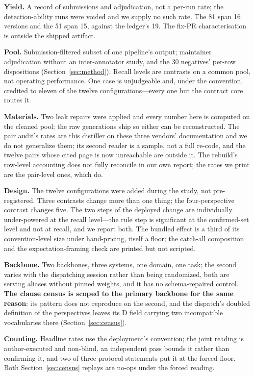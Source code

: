 \documentclass[acmsmall,screen,review,anonymous]{acmart}
\begin{document}
\textbf{Yield.} A record of submissions and adjudication, not a per-run rate; the detection-ability
runs were voided and we supply no such rate. The 81 span 16 versions and the 51 span 15, against the
ledger's 19. The fix-PR characterisation is outside the shipped artifact.

\textbf{Pool.} Submission-filtered subset of one pipeline's output; maintainer adjudication without
an inter-annotator study, and the 30 negatives' per-row dispositions (Section~\ref{sec:method}).
Recall levels are contrasts on a
common pool, not operating performance. One case is unjudgeable and, under the convention, credited
to eleven of the twelve configurations---every one but the contract core routes it.

\textbf{Materials.} Two leak repairs were applied and every number here is computed on the cleaned
pool; the raw generations ship so either can be reconstructed. The pair audit's rates are this
distiller on these three vendors' documentation and we do not generalize them; its second reader is
a sample, not a full re-code, and the twelve pairs whose cited page is now unreachable are outside
it. The rebuild's row-level accounting does not fully reconcile in our own report; the rates we
print are the pair-level ones, which do.

\textbf{Design.} The twelve configurations were added during the study, not pre-registered. Three
contrasts change more than one thing; the four-perspective contrast changes five. The two steps of
the deployed change are individually under-powered at the recall level---the rule step is significant
at the confirmed-set level and not at recall, and we report both. The bundled effect is a
third of its convention-level size under hand-pricing, itself a floor; the catch-all composition
and the expectation-framing check are printed but not scripted.

\textbf{Backbone.} Two backbones, three systems, one domain, one task; the second varies with the
dispatching session rather than being randomized, both are serving aliases without pinned weights,
and it has no schema-repaired control. \textbf{The clause census is scoped to the primary backbone
for the same reason}: its pattern does not reproduce on the second, and the dispatch's doubled
definition of the perspectives leaves its D field carrying two incompatible vocabularies there
(Section~\ref{sec:census}).

\textbf{Counting.} Headline rates use the deployment's convention; the joint reading is
author-executed and non-blind, an independent pass bounds it rather than confirming it, and two of
three protocol statements put it at the forced floor. Both Section~\ref{sec:census} replays are
no-ops under the forced reading.
\end{document}
